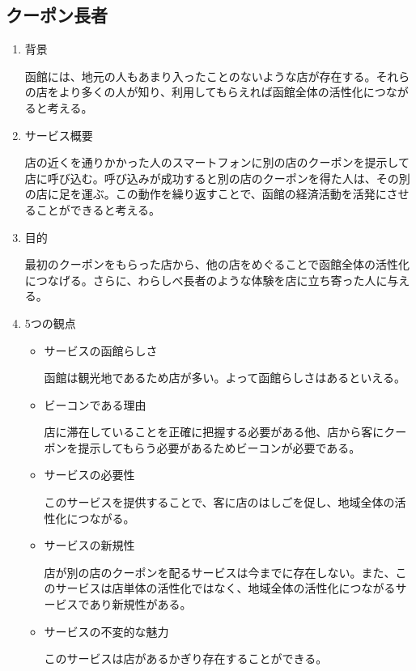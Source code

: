 \subsection{クーポン長者}
\begin{enumerate}
    \item 背景
    \par 函館には、地元の人もあまり入ったことのないような店が存在する。それらの店をより多くの人が知り、利用してもらえれば函館全体の活性化につながると考える。
    \item サービス概要
    \par 店の近くを通りかかった人のスマートフォンに別の店のクーポンを提示して店に呼び込む。呼び込みが成功すると別の店のクーポンを得た人は、その別の店に足を運ぶ。この動作を繰り返すことで、函館の経済活動を活発にさせることができると考える。
    \item 目的
    \par 最初のクーポンをもらった店から、他の店をめぐることで函館全体の活性化につなげる。さらに、わらしべ長者のような体験を店に立ち寄った人に与える。
    \item 5つの観点
    \begin{itemize}
        \item サービスの函館らしさ
        \par 函館は観光地であるため店が多い。よって函館らしさはあるといえる。
        \item ビーコンである理由
        \par 店に滞在していることを正確に把握する必要がある他、店から客にクーポンを提示してもらう必要があるためビーコンが必要である。
        \item サービスの必要性
        \par このサービスを提供することで、客に店のはしごを促し、地域全体の活性化につながる。
        \item サービスの新規性
        \par 店が別の店のクーポンを配るサービスは今までに存在しない。また、このサービスは店単体の活性化ではなく、地域全体の活性化につながるサービスであり新規性がある。
        \item サービスの不変的な魅力
        \par このサービスは店があるかぎり存在することができる。
    \end{itemize}
\end{enumerate}

